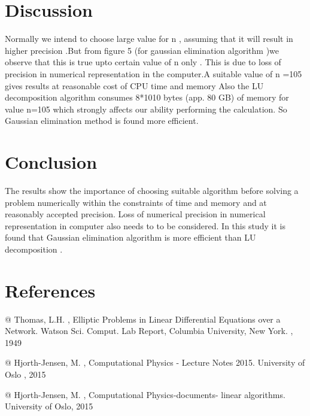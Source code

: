 \documentclass{article}
\begin{document}
\section{Discussion}

Normally we intend to choose large value for n , assuming that it will result in higher precision .But from figure 5 (for gaussian elimination algorithm )we observe that this is true upto certain value of n only . This is due to loss of precision in numerical representation in the computer.A suitable value of n =105 gives results at reasonable cost of CPU time and memory 
Also the LU decomposition algorithm consumes 8*1010  bytes (app. 80 GB) of memory for value n=105   which strongly affects our ability performing the calculation.
So Gaussian elimination method is found more efficient.
\section{Conclusion}
The results show the importance of choosing suitable algorithm before solving a problem numerically within the constraints of time and memory and at reasonably accepted precision. Loss of numerical precision in numerical representation in computer also needs to to be considered.
In this study it is found that Gaussian elimination algorithm is more efficient than LU decomposition .

\section{References} 
\citep{adams1995hitchhiker}



@{ {Thomas, L.H. },
{ Elliptic Problems in Linear Differential Equations over a Network.
Watson Sci. Comput. Lab Report, Columbia University, New York. },
{1949}
}

@{ {Hjorth-Jensen, M.  },
{Computational Physics - Lecture Notes 2015. University of Oslo },
{2015}
}

@{ {Hjorth-Jensen, M. },
{Computational Physics-documents- linear algorithms. University of Oslo},
{2015}
}
\end{document}
